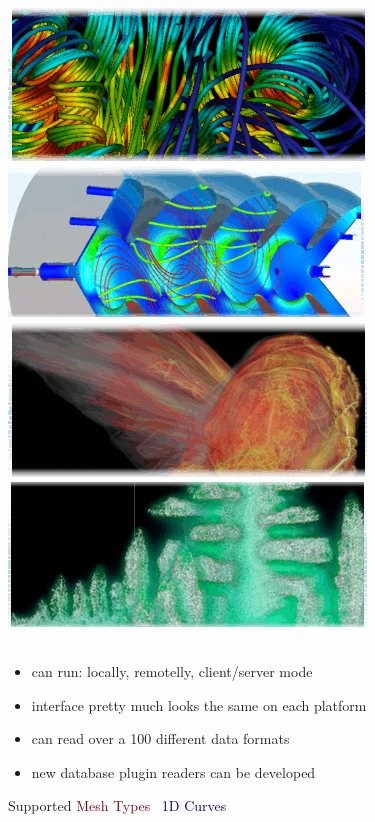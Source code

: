 \begin{frame}
\frametitle{\href{https://wci.llnl.gov/simulation/computer-codes/visit/}{\includegraphics[height=.85cm]{figs/visit-logos/VisIt-01}} \href{https://wci.llnl.gov/simulation/computer-codes/visit/}{\includegraphics[height=.875cm]{figs/visit-logos/VisIt-02}} \href{https://wci.llnl.gov/simulation/computer-codes/visit/}{\includegraphics[height=.875cm]{figs/visit-logos/VisIt-03}} \href{https://wci.llnl.gov/simulation/computer-codes/visit/}{\includegraphics[height=.875cm]{figs/visit-logos/VisIt-04}} \hspace{-8.5cm}{\bf \textcolor{white}{VisIt}}}

\begin{columns}
\begin{column}{5.5cm}
\begin{itemize}
        \item can run: locally, remotelly, client/server mode
        \item interface pretty much looks the same on each platform
        \item can read over a 100 different data formats
        \item new database plugin readers can be developed
\end{itemize}
\pause
\begin{beamerboxesrounded}[upper=block head,lower=block body,shadow=true]{ Supported \textcolor{DarkRed}{Mesh Types} }
        ~\textcolor{DarkBlue}{1D Curves}


\end{beamerboxesrounded}
\end{column}
\end{columns}
\end{frame}

